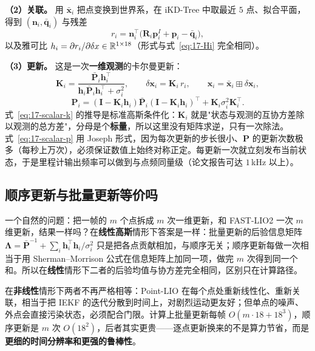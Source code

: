 \textbf{（2）关联。} 用 $\bar{\bm{x}}_i$ 把点变换到世界系，在 iKD-Tree 中取最近 $5$ 点、拟合平面，得到 $(\bm{n}_i,\bar{\bm{q}}_i)$ 与残差
\begin{equation}\label{eq:17-point-residual}
  r_i=\bm{n}_i^{\top}\bigl(\bm{R}_i\bm{p}_i^{I}+\bm{p}_i-\bar{\bm{q}}_i\bigr),
\end{equation}
以及雅可比 $h_i=\partial r_i/\partial\delta x\in\mathbb{R}^{1\times18}$（形式与式~\eqref{eq:17-Hi} 完全相同）。

\textbf{（3）更新。} 这是一次\textbf{一维观测}的卡尔曼更新：
\begin{equation}\label{eq:17-scalar-k}
  \bm{K}_i=\frac{\bar{\bm{P}}_i\bm{h}_i^{\top}}{\bm{h}_i\bar{\bm{P}}_i\bm{h}_i^{\top}+\sigma_i^2},\qquad
  \delta\bm{x}_i=\bm{K}_i\,r_i,\qquad
  \bm{x}_i=\bar{\bm{x}}_i\boxplus\delta\bm{x}_i,
\end{equation}
\begin{equation}\label{eq:17-scalar-p}
  \bm{P}_i=(\bm{I}-\bm{K}_i\bm{h}_i)\bar{\bm{P}}_i(\bm{I}-\bm{K}_i\bm{h}_i)^{\top}+\bm{K}_i\sigma_i^2\bm{K}_i^{\top}.
\end{equation}
式~\eqref{eq:17-scalar-k} 的推导是标准高斯条件化：$\bm{K}_i$ 就是"状态与观测的互协方差除以观测的总方差"，分母是个\textbf{标量}，所以这里没有矩阵求逆，只有一次除法。式~\eqref{eq:17-scalar-p} 用 Joseph 形式，因为每次更新的步长很小、$\bm{P}$ 的更新次数极多（每秒上万次），必须保证数值上始终对称正定。每更新一次就立刻发布当前状态，于是里程计输出频率可以做到与点频同量级（论文报告可达 $1$\,kHz 以上）。

\subsection{顺序更新与批量更新等价吗}

一个自然的问题：把一帧的 $m$ 个点拆成 $m$ 次一维更新，和 FAST-LIO2 一次 $m$ 维更新，结果一样吗？在\textbf{线性高斯}情形下答案是一样：批量更新的后验信息矩阵 $\bm{\Lambda}=\bar{\bm{P}}^{-1}+\sum_i\bm{h}_i^{\top}\bm{h}_i/\sigma_i^2$ 只是把各点贡献相加，与顺序无关；顺序更新每做一次相当于用 Sherman--Morrison 公式在信息矩阵上加同一项，做完 $m$ 次得到同一个和。所以在\textbf{线性}情形下二者的后验均值与协方差完全相同，区别只在计算路径。

在\textbf{非线性}情形下两者不再严格相等：Point-LIO 在每个点处重新线性化、重新关联，相当于把 IEKF 的迭代分散到时间上，对剧烈运动更友好；但单点的噪声、外点会直接污染状态，必须配合门限。计算上批量更新每帧 $O(m\cdot18+18^3)$，顺序更新是 $m$ 次 $O(18^2)$，后者其实更贵——逐点更新换来的不是算力节省，而是\textbf{更细的时间分辨率和更强的鲁棒性}。


